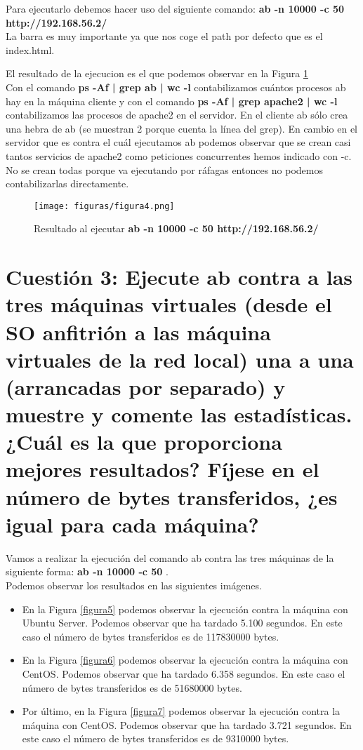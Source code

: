 Para ejecutarlo debemos hacer uso del siguiente comando: \textbf{ab -n 10000 -c 50 http://192.168.56.2/}\\
La barra es muy importante ya que nos coge el path por defecto que es el index.html.

El resultado de la ejecucion es el que podemos observar en la Figura \ref{figura4}\\
Con el comando \textbf{ps -Af |  grep ab | wc -l} contabilizamos cuántos procesos ab hay en la máquina cliente y con el comando \textbf{ps -Af |  grep apache2 | wc -l} contabilizamos las procesos de apache2 en el servidor.
En el cliente ab sólo crea una hebra de ab (se muestran 2 porque cuenta la línea del grep). En cambio en el servidor que es contra el cuál ejecutamos ab podemos observar que se crean casi tantos servicios de apache2 como peticiones concurrentes hemos indicado con -c. No se crean todas porque va ejecutando por ráfagas entonces no podemos contabilizarlas directamente.

\begin{figure}[H] %
	\centering
	\texttt{[image: figuras/figura4.png]}  %
	
	
	\caption{Resultado al ejecutar \textbf{ab -n 10000 -c 50 http://192.168.56.2/}}
	\label{figura4}
\end{figure}


\section{Cuestión 3: Ejecute ab contra a las tres máquinas virtuales (desde el SO anfitrión a las máquina virtuales de la red local) una a una (arrancadas por separado) y muestre y comente las estadísticas. ¿Cuál es la que proporciona mejores resultados? Fíjese en el número de bytes transferidos, ¿es igual para cada máquina?}

Vamos a realizar la ejecución del comando ab contra las tres máquinas de la siguiente forma: \textbf{ab -n 10000 -c 50} .\\
Podemos observar los resultados en las siguientes imágenes.
\begin{itemize}
	\item En la Figura \ref{figura5} podemos observar la ejecución contra la máquina con Ubuntu Server. Podemos observar que ha tardado 5.100 segundos. En este caso el número de bytes transferidos es de 117830000 bytes.
	\item En la Figura \ref{figura6} podemos observar la ejecución contra la máquina con CentOS. Podemos observar que ha tardado 6.358 segundos. En este caso el número de bytes transferidos es de 51680000 bytes.
	\item Por último, en la Figura \ref{figura7} podemos observar la ejecución contra la máquina con CentOS. Podemos observar que ha tardado 3.721 segundos. En este caso el número de bytes transferidos es de 9310000 bytes.
\end{itemize} 


